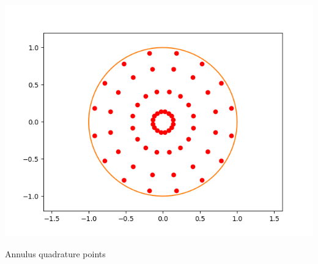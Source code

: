 \documentclass[10pt,a4paper]{letter}
\begin{document}
\includegraphics[scale=.5]{disk_n4}

\pagebreak
Annulus quadrature points\\
\end{document}
